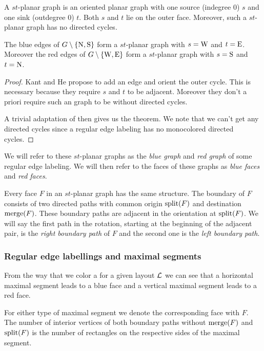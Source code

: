     A $st$-planar graph is an oriented planar graph with one source (indegree 0) $s$ and one sink (outdegree 0) $t$. Both $s$ and $t$ lie on the outer face. Moreover, such a $st$-planar graph has no directed cycles.

    \begin{thrm}
      \label{th:rel:stPlanarGraphs}
      The blue edges of $G\setminus \left\lbrace {\mathrm{N},\mathrm{S}} \right\rbrace$ form a $st$-planar graph with $s= \mathrm{W}$ and $t=\mathrm{E}$. Moreover the red edges of $G\setminus \left\lbrace {\mathrm{W},\mathrm{E}} \right\rbrace$ form a $st$-planar graph with $s= \mathrm{S}$ and $t= \mathrm{N}$.
    \end{thrm}
    \begin{proof}
      Kant and He propose to add an edge and orient the outer cycle. This is necessary because they require $s$ and $t$ to be adjacent. Moreover they don't a priori require such an graph to be without directed cycles.

      A trivial adaptation of \cite[pp.179]{Kant1997} then gives us the theorem. We note that we can't get any directed cycles since a regular edge labeling has no monocolored directed cycles.
    \end{proof}

    We will refer to these $st$-planar graphs as the \emph{blue graph} and \emph{red graph} of some regular edge labeling. We will then refer to the faces of these graphs as \emph{blue faces} and \emph{red faces}.

    Every face $F$ in an $st$-planar graph has the same structure. The boundary of $F$ consists of two directed paths with common origin $\operatorname{split}(F)$ and  destination $\operatorname{merge}(F)$.
    These boundary paths are adjacent in the orientation at $\operatorname{split}(F)$. We will say the first path in the rotation, starting at the beginning of the adjacent pair, is the \emph{right boundary path} of $F$ and the second one is the \emph{left boundary path}.

  \subsubsection{Regular edge labellings and maximal segments}
    From the way that we color a \rel for a given layout $\mathcal{L}$ we can see that a horizontal maximal segment leads to a blue face and a vertical maximal segment leads to a red face.

    For either type of maximal segment we denote the corresponding face with $F$. The number of interior vertices of both boundary paths without $\operatorname{merge}(F)$ and $\operatorname{split}(F)$ is the number of rectangles on the respective sides of the maximal segment.

